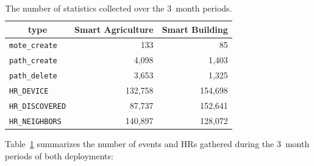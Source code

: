 \documentclass{elsarticle}
\newcommand{\building}            {Smart Building\xspace}
\newcommand{\agri}                {Smart Agriculture\xspace}
\newcommand{\HRNEIGHBORS}         {{\tt HR\_NEIGHBORS}\xspace}
\newcommand{\HRDISCOVERED}        {{\tt HR\_DISCOVERED}\xspace}
\newcommand{\HRDEVICE}            {{\tt HR\_DEVICE}\xspace}
\newcommand{\pathcreate}          {{\tt path\_create}\xspace}
\newcommand{\pathdelete}          {{\tt path\_delete}\xspace}
\newcommand{\motecreate}          {{\tt mote\_create}\xspace}
\newcommand{\PEACHNUMHRNEIGHBORS} {140,897\xspace}
\newcommand{\EVANUMHRNEIGHBORS}   {128,072\xspace}
\begin{document}
\begin{table}
    \centering
    \begin{tabular}{|l|r|r|}
        \toprule
        \multicolumn{1}{|c|}{type} & \multicolumn{1}{|c|}{\agri} & \multicolumn{1}{|c|}{\building} \\ \hline
        \hline
        \motecreate                &                         133 &                              85 \\ \hline
        \pathcreate                &                       4,098 &                           1,403 \\ \hline
        \pathdelete                &                       3,653 &                           1,325 \\ \hline
        \HRDEVICE                  &                     132,758 &                         154,698 \\ \hline
        \HRDISCOVERED              &                      87,737 &                         152,641 \\ \hline
        \HRNEIGHBORS               &        \PEACHNUMHRNEIGHBORS &              \EVANUMHRNEIGHBORS \\ \hline
    \end{tabular}
    \caption{The number of statistics collected over the 3~month periods.}
    \label{tab:msg_stats}
\end{table}

Table~\ref{tab:msg_stats} summarizes the number of events and HRs gathered during the 3~month periods of both deployments:
\end{document}
